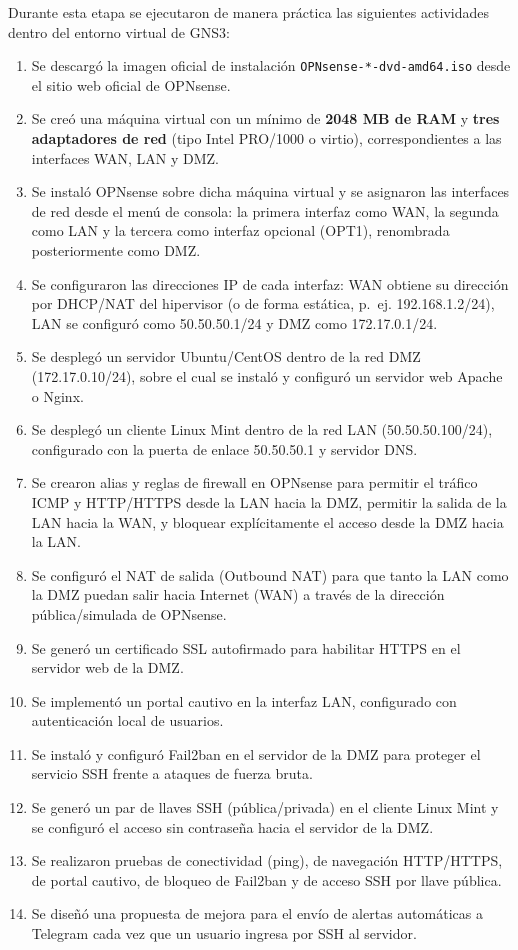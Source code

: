 \documentclass{article}
\providecommand{\tightlist}{%
  \setlength{\itemsep}{0pt}\setlength{\parskip}{0pt}}
\renewcommand{\_}{\oldunderscore\hskip0pt\relax}
\begin{document}
Durante esta etapa se ejecutaron de manera práctica las siguientes
actividades dentro del entorno virtual de GNS3:

\begin{enumerate}
\def\labelenumi{\arabic{enumi}.}
\tightlist
\item
  Se descargó la imagen oficial de instalación
  \texttt{OPNsense-*-dvd-amd64.iso} desde el sitio web oficial de
  OPNsense.
\item
  Se creó una máquina virtual con un mínimo de \textbf{2048 MB de RAM} y
  \textbf{tres adaptadores de red} (tipo Intel PRO/1000 o virtio),
  correspondientes a las interfaces WAN, LAN y DMZ.
\item
  Se instaló OPNsense sobre dicha máquina virtual y se asignaron las
  interfaces de red desde el menú de consola: la primera interfaz como
  WAN, la segunda como LAN y la tercera como interfaz opcional (OPT1),
  renombrada posteriormente como DMZ.
\item
  Se configuraron las direcciones IP de cada interfaz: WAN obtiene su
  dirección por DHCP/NAT del hipervisor (o de forma estática, p.~ej.
  192.168.1.2/24), LAN se configuró como 50.50.50.1/24 y DMZ como
  172.17.0.1/24.
\item
  Se desplegó un servidor Ubuntu/CentOS dentro de la red DMZ
  (172.17.0.10/24), sobre el cual se instaló y configuró un servidor web
  Apache o Nginx.
\item
  Se desplegó un cliente Linux Mint dentro de la red LAN
  (50.50.50.100/24), configurado con la puerta de enlace 50.50.50.1 y
  servidor DNS.
\item
  Se crearon alias y reglas de firewall en OPNsense para permitir el
  tráfico ICMP y HTTP/HTTPS desde la LAN hacia la DMZ, permitir la
  salida de la LAN hacia la WAN, y bloquear explícitamente el acceso
  desde la DMZ hacia la LAN.
\item
  Se configuró el NAT de salida (Outbound NAT) para que tanto la LAN
  como la DMZ puedan salir hacia Internet (WAN) a través de la dirección
  pública/simulada de OPNsense.
\item
  Se generó un certificado SSL autofirmado para habilitar HTTPS en el
  servidor web de la DMZ.
\item
  Se implementó un portal cautivo en la interfaz LAN, configurado con
  autenticación local de usuarios.
\item
  Se instaló y configuró Fail2ban en el servidor de la DMZ para proteger
  el servicio SSH frente a ataques de fuerza bruta.
\item
  Se generó un par de llaves SSH (pública/privada) en el cliente Linux
  Mint y se configuró el acceso sin contraseña hacia el servidor de la
  DMZ.
\item
  Se realizaron pruebas de conectividad (ping), de navegación
  HTTP/HTTPS, de portal cautivo, de bloqueo de Fail2ban y de acceso SSH
  por llave pública.
\item
  Se diseñó una propuesta de mejora para el envío de alertas automáticas
  a Telegram cada vez que un usuario ingresa por SSH al servidor.
\end{enumerate}
\end{document}
